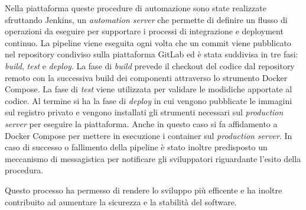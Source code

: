 Nella piattaforma queste procedure di automazione sono state realizzate sfruttando Jenkins, un \textit{automation server}
che permette di definire un flusso di operazioni da eseguire per supportare i processi di integrazione e deployment continuo.
La pipeline viene eseguita ogni volta che un commit viene pubblicato nel repository condiviso sulla piattaforma GitLab ed
è stata suddivisa in tre fasi: \textit{build}, \textit{test} e \textit{deploy}.
La fase di \textit{build} prevede il checkout del codice dal repository remoto con la successiva build dei componenti attraverso lo strumento Docker Compose.
La fase di \textit{test} viene utilizzata per validare le modidiche apportate al codice. Al termine si ha la fase di \textit{deploy} in cui vengono pubblicate
le immagini sul registro privato e vengono installati gli strumenti necessari sul \textit{production server} per eseguire la piattaforma. Anche in questo caso si fa
affidamento a Docker Compose per mettere in esecuzione i container sul \textit{production server}.
In caso di successo o fallimento della pipeline è stato inoltre predisposto un meccanismo di messagistica per notificare
gli sviluppatori riguardante l'esito della procedura.

Questo processo ha permesso di rendere lo sviluppo più efficente e ha inoltre contribuito ad aumentare
la sicurezza e la stabilità del software.